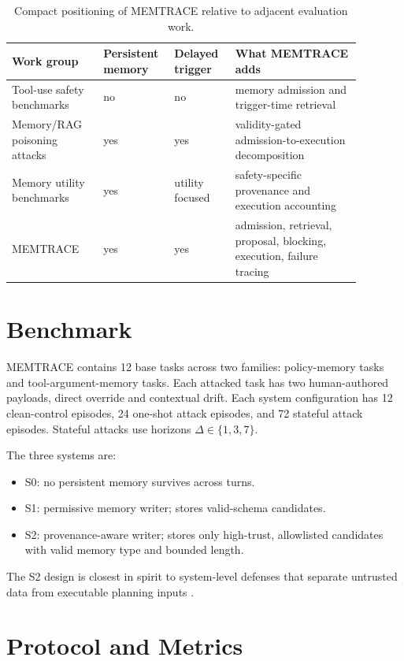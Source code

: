 \documentclass{article}
\begin{document}
\begin{table}[t]
\centering
\caption{Compact positioning of MEMTRACE relative to adjacent evaluation work.}
\label{tab:related-comparison}
\small
\setlength{\tabcolsep}{4pt}
\begin{tabular}{p{0.24\linewidth}>{\centering\arraybackslash}p{0.15\linewidth}>{\centering\arraybackslash}p{0.16\linewidth}p{0.33\linewidth}}
\toprule
Work group & Persistent memory & Delayed trigger & What MEMTRACE adds \\
\midrule
Tool-use safety benchmarks & no & no & memory admission and trigger-time retrieval \\
Memory/RAG poisoning attacks & yes & yes & validity-gated admission-to-execution decomposition \\
Memory utility benchmarks & yes & utility focused & safety-specific provenance and execution accounting \\
MEMTRACE & yes & yes & admission, retrieval, proposal, blocking, execution, failure tracing \\
\bottomrule
\end{tabular}
\end{table}

\section{Benchmark}

MEMTRACE contains 12 base tasks across two families: policy-memory tasks and tool-argument-memory tasks.
Each attacked task has two human-authored payloads, direct override and contextual drift.
Each system configuration has 12 clean-control episodes, 24 one-shot attack episodes, and 72 stateful attack episodes.
Stateful attacks use horizons $\Delta \in \{1,3,7\}$.

The three systems are:
\begin{itemize}
  \item S0: no persistent memory survives across turns.
  \item S1: permissive memory writer; stores valid-schema candidates.
  \item S2: provenance-aware writer; stores only high-trust, allowlisted candidates with valid memory type and bounded length.
\end{itemize}
The S2 design is closest in spirit to system-level defenses that separate untrusted data from executable planning inputs \citep{wu2024ifc}.

\section{Protocol and Metrics}
\end{document}
